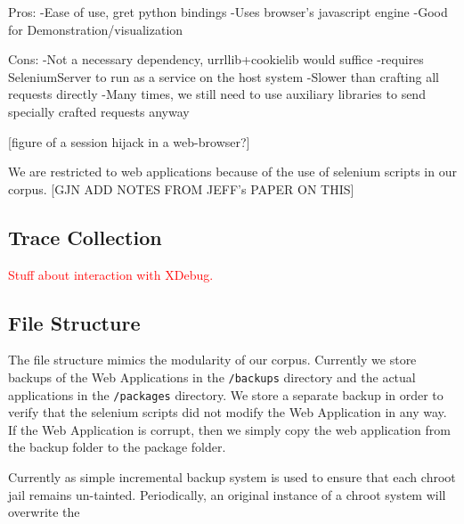 \documentclass[letterpaper,twocolumn,10pt]{article}
\begin{document}
Pros:
-Ease of use, gret python bindings
-Uses browser's javascript engine
-Good for Demonstration/visualization

Cons:
-Not a necessary dependency, urrllib+cookielib would suffice
-requires SeleniumServer to run as a service on the host system
-Slower than crafting all requests directly
-Many times, we still need to use auxiliary libraries to send specially crafted requests anyway

[figure of a session hijack in a web-browser?]

We are restricted to web applications because of the use of selenium scripts in our corpus. [GJN ADD NOTES FROM JEFF's PAPER ON THIS]  


%
%
%

%


\subsection{Trace Collection}
\textcolor{red}{
Stuff about interaction with XDebug.
}


\subsection{File Structure}

The file structure mimics the modularity of our corpus.  Currently we store backups of the Web Applications in the {\tt/backups} directory and the actual applications in the {\tt/packages} directory.  We store a separate backup in order to verify that the selenium scripts did not modify the Web Application in any way.  If the Web Application is corrupt, then we simply copy the web application from the backup folder to the package folder.  

Currently as simple incremental backup system is used to ensure that each chroot jail remains un-tainted. Periodically, an original instance of a chroot system will overwrite the 
\end{document}
